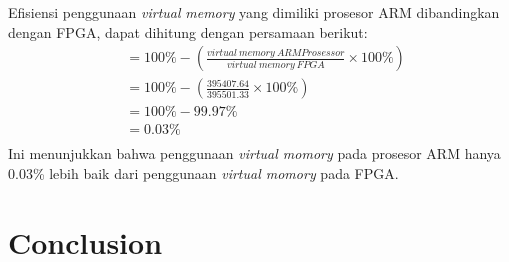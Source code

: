 Efisiensi penggunaan \textit{virtual} \textit{memory} yang dimiliki prosesor ARM dibandingkan dengan FPGA, dapat dihitung dengan persamaan berikut:
\begin{equation*}
    \begin{split}
& = 100\% - \left( \frac{virtual\ memory\ ARM Prosessor}{virtual\ memory\ FPGA} \times 100\% \right) \\
& = 100\% - \left( \frac{395407.64}{395501.33} \times 100\% \right) \\
& = 100\% - 99.97\% \\
& = 0.03\% \\
    \end{split}
\end{equation*}
Ini menunjukkan bahwa penggunaan \textit{virtual momory} pada prosesor ARM hanya 0.03\% lebih baik dari penggunaan \textit{virtual momory} pada FPGA.


\section{Conclusion}


